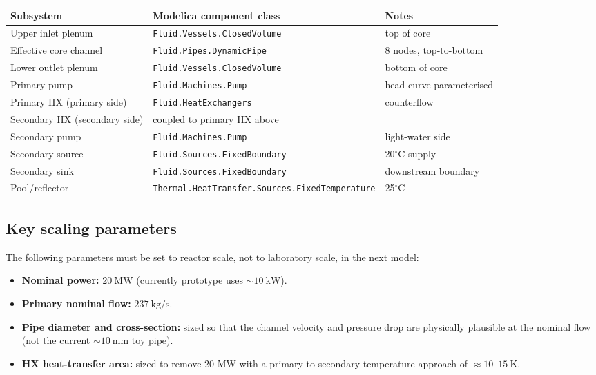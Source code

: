 \documentclass[11pt]{article}
\begin{document}
\begin{center}
\begin{tabular}{lll}
\hline
Subsystem & Modelica component class & Notes \\
\hline
Upper inlet plenum & \texttt{Fluid.Vessels.ClosedVolume} & top of core \\
Effective core channel & \texttt{Fluid.Pipes.DynamicPipe} & 8 nodes, top-to-bottom \\
Lower outlet plenum & \texttt{Fluid.Vessels.ClosedVolume} & bottom of core \\
Primary pump & \texttt{Fluid.Machines.Pump} & head-curve parameterised \\
Primary HX (primary side) & \texttt{Fluid.HeatExchangers} & counterflow \\
Secondary HX (secondary side) & coupled to primary HX above & \\
Secondary pump & \texttt{Fluid.Machines.Pump} & light-water side \\
Secondary source & \texttt{Fluid.Sources.FixedBoundary} & 20$^{\circ}$C supply \\
Secondary sink & \texttt{Fluid.Sources.FixedBoundary} & downstream boundary \\
Pool/reflector & \texttt{Thermal.HeatTransfer.Sources.FixedTemperature} & 25$^{\circ}$C \\
\hline
\end{tabular}
\end{center}

\subsection{Key scaling parameters}

The following parameters must be set to reactor scale, not to laboratory
scale, in the next model:

\begin{itemize}
  \item \textbf{Nominal power:} $20\ \mathrm{MW}$ (currently prototype uses $\sim 10\ \mathrm{kW}$).
  \item \textbf{Primary nominal flow:} $237\ \mathrm{kg/s}$.
  \item \textbf{Pipe diameter and cross-section:} sized so that the
        channel velocity and pressure drop are physically plausible at
        the nominal flow (not the current $\sim 10\ \mathrm{mm}$ toy pipe).
  \item \textbf{HX heat-transfer area:} sized to remove 20 MW with a
        primary-to-secondary temperature approach of $\approx 10$--$15\ \mathrm{K}$.
\end{itemize}
\end{document}
